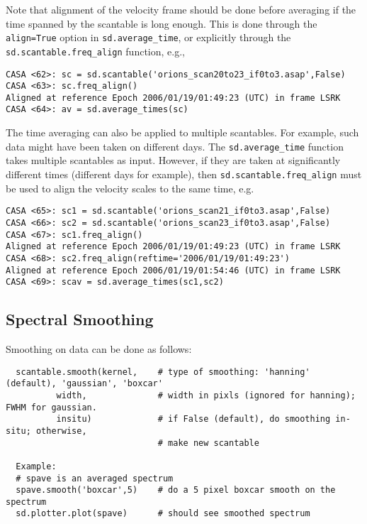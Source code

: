 Note that alignment of the velocity frame should be done before
averaging if the time spanned by the scantable is 
long enough.  This is done through the {\tt align=True} option in
{\tt sd.average\_time}, or explicitly through the
{\tt sd.scantable.freq\_align} function, e.g.,
\small
\begin{verbatim}
CASA <62>: sc = sd.scantable('orions_scan20to23_if0to3.asap',False)
CASA <63>: sc.freq_align()
Aligned at reference Epoch 2006/01/19/01:49:23 (UTC) in frame LSRK
CASA <64>: av = sd.average_times(sc)
\end{verbatim}
\normalsize

The time averaging can also be applied to multiple scantables.  For example, such data
might have been taken on different days.  The
{\tt sd.average\_time} function takes multiple scantables as input.
However, if they are taken at significantly different times (different days for
example), then {\tt sd.scantable.freq\_align} must be used to align
the velocity scales to the same time, e.g.
\small
\begin{verbatim}
CASA <65>: sc1 = sd.scantable('orions_scan21_if0to3.asap',False)
CASA <66>: sc2 = sd.scantable('orions_scan23_if0to3.asap',False)
CASA <67>: sc1.freq_align()
Aligned at reference Epoch 2006/01/19/01:49:23 (UTC) in frame LSRK
CASA <68>: sc2.freq_align(reftime='2006/01/19/01:49:23')
Aligned at reference Epoch 2006/01/19/01:54:46 (UTC) in frame LSRK
CASA <69>: scav = sd.average_times(sc1,sc2)
\end{verbatim}
\normalsize

\subsection{Spectral Smoothing}
\label{subsection:sd.asap.smoothing}

Smoothing on data can be done as follows:

\small
\begin{verbatim}
  scantable.smooth(kernel,    # type of smoothing: 'hanning' (default), 'gaussian', 'boxcar'
          width,              # width in pixls (ignored for hanning); FWHM for gaussian.
          insitu)             # if False (default), do smoothing in-situ; otherwise, 
                              # make new scantable

  Example:
  # spave is an averaged spectrum
  spave.smooth('boxcar',5)    # do a 5 pixel boxcar smooth on the spectrum
  sd.plotter.plot(spave)      # should see smoothed spectrum
\end{verbatim}
\normalsize

